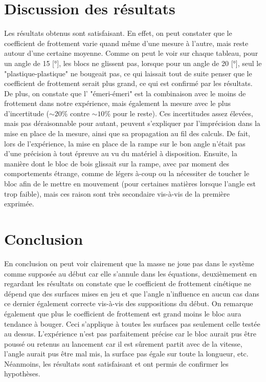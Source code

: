 \documentclass[twoside,twocolumn]{article}
\begin{document}
\section{Discussion des résultats}
Les résultats obtenus sont satisfaisant. En effet, on peut constater que le coefficient de frottement varie quand même d'une mesure à l'autre, mais reste autour d'une certaine moyenne. Comme on peut le voir sur chaque tableau, pour un angle de 15 [°], les blocs ne glissent pas, lorsque pour un angle de 20 [°], seul le "plastique-plastique" ne bougeait pas, ce qui laissait tout de suite penser que le coefficient de frottement serait plus grand, ce qui est confirmé par les résultats. De plus, on constate que l' "émeri-émeri" est la combinaison avec le moins de frottement dans notre expérience, mais également la mesure avec le plus d'incertitude ($\sim 20 \%$ contre $\sim 10 \%$ pour le reste). Ces incertitudes assez élevées, mais pas déraisonnable pour autant, peuvent s'expliquer par l'imprécision dans la mise en place de la mesure, ainsi que sa propagation au fil des calculs. De fait, lors de l'expérience, la mise en place de la rampe sur le bon angle n'était pas d'une précision à tout épreuve au vu du matériel à disposition. Ensuite, la manière dont le bloc de bois glissait sur la rampe, avec par moment des comportements étrange, comme de légers à-coup ou la nécessiter de toucher le bloc afin de le mettre en mouvement (pour certaines matières lorsque l'angle est trop faible), mais ces raison sont très secondaire vis-à-vis de la première exprimée.


\section{Conclusion}
En conclusion on peut voir clairement que la masse ne joue pas dans le système comme supposée au début car elle s'annule dans les équations, deuxièmement en regardant les résultats on constate que le coefficient de frottement cinétique ne dépend que des surfaces mises en jeu et que l'angle n'influence en aucun cas dans ce dernier également correcte vis-à-vis des suppositions du début. On remarque également que plus le coefficient de frottement est grand moins le bloc aura tendance à bouger. Ceci s'applique à toutes les surfaces pas seulement celle testée au dessus. L'expérience n'est pas parfaitement précise car le bloc aurait pus être poussé ou retenus au lancement car il est sûrement partit avec de la vitesse, l'angle aurait pus être mal mis, la surface pas égale sur toute la longueur, etc. Néanmoins, les résultats sont satisfaisant et ont permis de confirmer les hypothèses.
\end{document}
